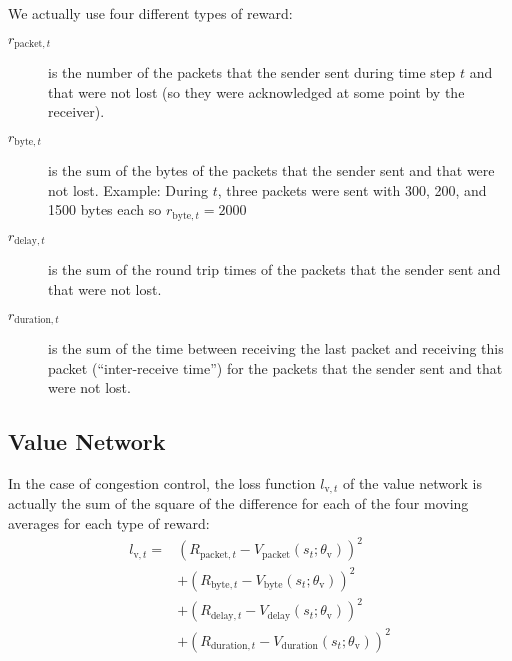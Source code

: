 \documentclass[sigconf]{acmart}
\begin{document}
We actually use four different types of reward: 
\begin{description}
\item[$\textit{r}_{\text{packet},t}$] is the number of the packets that the sender sent during time step $t$ and that were not lost (so they were acknowledged at some point by the receiver).
\item[$\textit{r}_{\text{byte},t}$] is the sum of the bytes of the packets that the sender sent and that were not lost. Example: During $t$, three packets were sent with 300, 200, and 1500 bytes each so $\textit{r}_{\text{byte},t} = 2000$
\item[$\textit{r}_{\text{delay},t}$] is the sum of the round trip times of the packets that the sender sent and that were not lost.
\item[$\textit{r}_{\text{duration},t}$] is the sum of the time between receiving the last packet and receiving this packet (``inter-receive time'') for the packets that the sender sent and that were not lost.
\end{description}


\subsection{Value Network}
\label{subsec:value}

In the case of congestion control, the loss function $l_{\text{v},t}$ of the value network is actually the sum of the square of the difference for each of the four moving averages for each type of reward:
\begin{align*}
l_{\text{v},t} =& \left(R_{\text{packet},t} - V_\text{packet}(s_t; \theta_\text{v})\right)^2 \\
&+\left(R_{\text{byte},t} - V_\text{byte}(s_t; \theta_\text{v})\right)^2 \\
&+\left(R_{\text{delay},t} - V_\text{delay}(s_t; \theta_\text{v})\right)^2 \\
&+\left(R_{\text{duration},t} - V_\text{duration}(s_t; \theta_\text{v})\right)^2
\end{align*}
\end{document}
